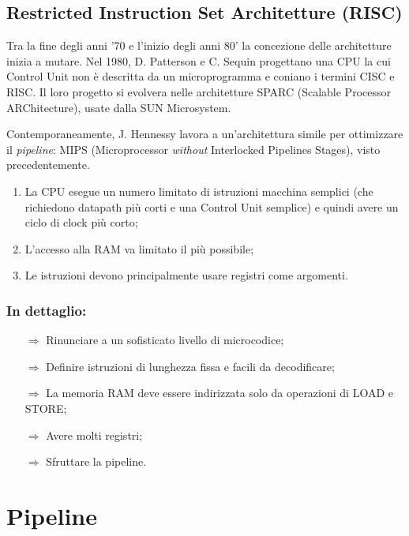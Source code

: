 \subsection{Restricted Instruction Set Architetture (RISC)}

Tra la fine degli anni '70 e l'inizio degli anni 80' la concezione delle architetture inizia a mutare. Nel 1980, D. Patterson e C. Sequin progettano una CPU la cui Control Unit non è descritta da un microprogramma e coniano i termini CISC e RISC.
Il loro progetto si evolvera nelle architetture SPARC (Scalable Processor ARChitecture), usate dalla SUN Microsystem. 

Contemporaneamente, J. Hennessy lavora a un'architettura simile per ottimizzare il \textit{pipeline}: MIPS (Microprocessor \textit{without} Interlocked Pipelines Stages), visto precedentemente. 


\begin{enumerate}
  \item La CPU esegue un numero limitato di istruzioni macchina semplici (che richiedono datapath più corti e una Control Unit semplice) e quindi avere un ciclo di clock più corto;
  \item L'accesso alla RAM va limitato il più possibile;
  \item Le istruzioni devono principalmente usare registri come argomenti.
\end{enumerate}

\subsubsection{In dettaglio:}

\begin{itemize}
  \item [$\Rightarrow$] Rinunciare a un sofisticato livello di microcodice;
  \item [$\Rightarrow$] Definire istruzioni di lunghezza fissa e facili da decodificare;
  \item [$\Rightarrow$] La memoria RAM deve essere indirizzata solo da operazioni di LOAD e STORE;
  \item [$\Rightarrow$] Avere molti registri;
  \item [$\Rightarrow$] Sfruttare la pipeline.
\end{itemize}


\section{Pipeline}








